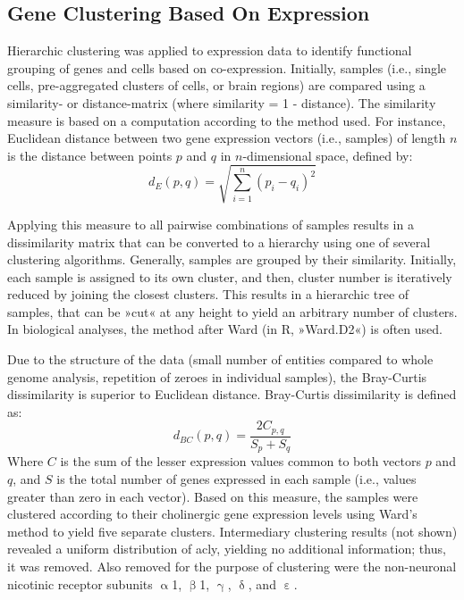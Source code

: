 \begin{method}

\section{Gene Clustering Based On Expression}

Hierarchic clustering was applied to expression data to identify functional grouping of genes and cells based on co-expression. Initially, samples (i.e., single cells, pre-aggregated clusters of cells, or brain regions) are compared using a similarity- or distance-matrix (where similarity = \num{1} - distance). The similarity measure is based on a computation according to the method used. For instance, Euclidean distance between two gene expression vectors (i.e., samples) of length $n$ is the distance between points $p$ and $q$ in $n$-dimensional space, defined by: $$d_E(p, q) = \sqrt{\sum_{i=1}^{n} (p_{i}-q_{i})^2}$$

Applying this measure to all pairwise combinations of samples results in a dissimilarity matrix that can be converted to a hierarchy using one of several clustering algorithms. Generally, samples are grouped by their similarity. Initially, each sample is assigned to its own cluster, and then, cluster number is iteratively reduced by joining the closest clusters. This results in a hierarchic tree of samples, that can be »cut« at any height to yield an arbitrary number of clusters. In biological analyses, the method after Ward (in R, »Ward.D2«) is often used.\cite{Murtagh2014}

Due to the structure of the data (small number of entities compared to whole genome analysis, repetition of zeroes in individual samples), the Bray-Curtis dissimilarity\cite{Bray1957} is superior to Euclidean distance. Bray-Curtis dissimilarity is defined as: $$d_{BC}(p, q) = \frac{2C_{p, q}}{S_p+S_q}$$ Where $C$ is the sum of the lesser expression values common to both vectors $p$ and $q$, and $S$ is the total number of genes expressed in each sample (i.e., values greater than zero in each vector). Based on this measure, the samples were clustered according to their cholinergic gene expression levels using Ward's method to yield five separate clusters. Intermediary clustering results (not shown) revealed a uniform distribution of \ac{acly}, yielding no additional information; thus, it was removed. Also removed for the purpose of clustering were the non-neuronal nicotinic receptor subunits $\upalpha$\num{1}, $\upbeta$\num{1}, $\upgamma$, $\updelta$, and $\upepsilon$. 

\end{method}

